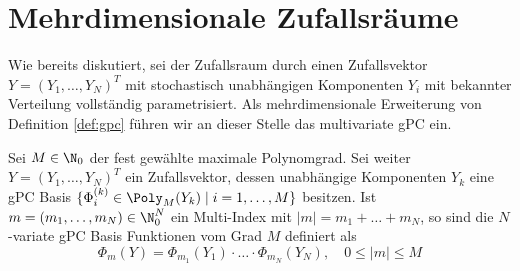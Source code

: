 \section{Mehrdimensionale Zufallsräume}
Wie bereits diskutiert, sei der Zufallsraum durch einen Zufallsvektor $Y=(Y_1,\dots,Y_N)^T$ mit stochastisch unabhängigen Komponenten $Y_i$ mit bekannter Verteilung vollständig parametrisiert. Als mehrdimensionale Erweiterung von Definition \ref{def:gpc} führen wir an dieser Stelle das multivariate gPC ein.
\begin{mathdef}
Sei $M\in\N_0$ der fest gewählte maximale Polynomgrad. Sei weiter $Y=(Y_1,\dots,Y_N)^T$ ein Zufallsvektor, dessen unabhängige Komponenten $Y_k$ eine gPC Basis $\lbrace \Phi_i^{(k)}\in\Poly_M(Y_k)\mid i=1,\dots,M\rbrace$ besitzen. Ist $m=(m_1,\dots,m_N)\in\N_0^N$ ein Multi-Index mit $|m|=m_1+\dots+m_N$, so sind die $N$-variate gPC Basis Funktionen vom Grad $M$ definiert als 
\[\Phi_m(Y)=\Phi_{m_1}(Y_1)\cdot\ldots\cdot\Phi_{m_N}(Y_N),\quad 0\le |m|\le M\]
\end{mathdef}

